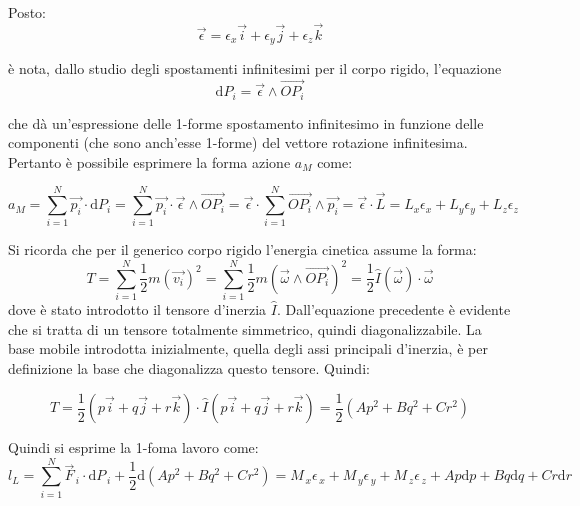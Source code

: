 \documentclass[11pt]{report}
\theoremstyle{plain}
\theoremstyle{definition}
\theoremstyle{remark}
\begin{document}
Posto:
\begin{displaymath}
\vec{\epsilon} = \epsilon_{x} \vec{i} + \epsilon_{y} \vec{j} + \epsilon_{z} \vec{k} 
\end{displaymath}

è nota, dallo studio degli spostamenti infinitesimi per il corpo rigido, l'equazione 
\begin{displaymath}
\textrm{d}P_{i} = \vec{\epsilon} \wedge \vec{OP_{i}}
\end{displaymath}

che dà un'espressione delle 1-forme spostamento infinitesimo in funzione delle componenti (che sono anch'esse 1-forme) del vettore rotazione infinitesima.
Pertanto è possibile esprimere la forma azione $a_{M}$ come:

\begin{equation}
a_{M} = \sum_{i=1}^{N} \vec{p_{i}} \cdot \textrm{d}P_{i} = \sum_{i=1}^{N} \vec{p_{i}} \cdot \vec{\epsilon} \wedge \vec{OP_{i}} = \vec{\epsilon} \cdot \sum_{i=1}^{N}  \vec{OP_{i}} \wedge \vec{p_{i}} = \vec{\epsilon} \cdot \vec{L} = L_{x}\epsilon_{x} + L_{y}\epsilon_{y} + L_{z}\epsilon_{z}
\end{equation}

Si ricorda che per il generico corpo rigido l'energia cinetica assume la forma: \begin{displaymath} T = \sum_{i=1}^{N} \dfrac{1}{2} m (\vec{v_{i}})^{2} = \sum_{i=1}^{N}\dfrac{1}{2} m ( \vec{\omega} \wedge \vec{OP_{i}})^2 = \dfrac{1}{2} \hat{I}(\vec{\omega}) \cdot \vec{\omega} \end{displaymath}
dove è stato introdotto il tensore d'inerzia $ \hat{I}$.
Dall'equazione precedente è evidente che si tratta di un tensore totalmente simmetrico, quindi diagonalizzabile. La base mobile introdotta inizialmente, quella degli assi principali d'inerzia, è per definizione la base che diagonalizza questo tensore. Quindi:

\begin{displaymath}
T = \dfrac{1}{2}(p \vec{i} + q \vec{j} + r \vec{k}) \cdot \hat{I}( p \vec{i} + q \vec{j} + r \vec{k}) = \dfrac{1}{2}( A p^{2} + B q^{2} + C r^{2})
\end{displaymath}

Quindi si esprime la 1-foma lavoro come:
\begin{equation}\label{eq:formalavoro}
l_{L} = \sum_{i=1}^{N} \vec{F}_{\, i} \cdot \textrm{d}P_{\, i} + \dfrac{1}{2}\textrm{d}( A p^{2} + B q^{2} + C r^{2})= M_{\, x} \epsilon_{\, x} +  M_{\, y} \epsilon_{\, y} +  M_{\, z} \epsilon_{\, z} + A p \textrm{d}p + B q \textrm{d}q + C r \textrm{d}r
\end{equation}
\end{document}
